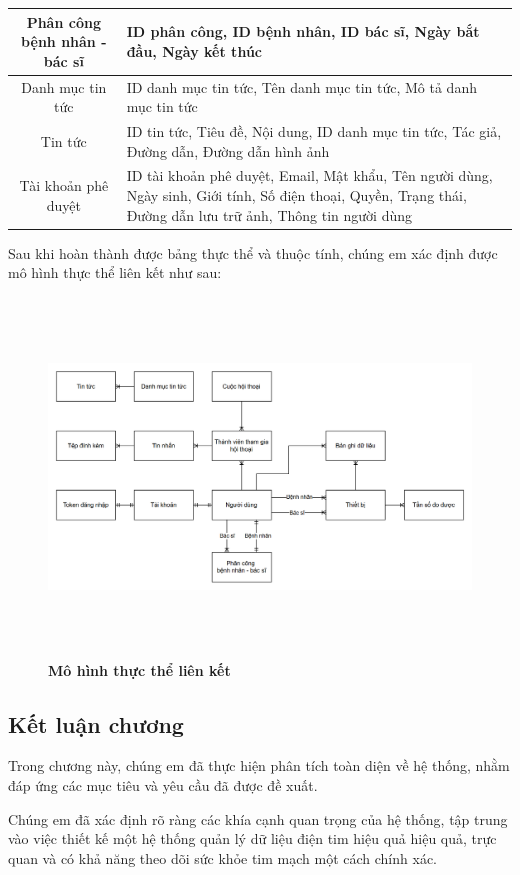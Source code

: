 \begin{table}[H]
\begin{tabularx}{0.9\textwidth}{|c|X|}
    \hline 
    Phân công bệnh nhân - bác sĩ & 
    ID phân công, ID bệnh nhân, ID bác sĩ, Ngày bắt đầu, Ngày kết thúc \\
    \hline
    Danh mục tin tức &
    ID danh mục tin tức, Tên danh mục tin tức, Mô tả danh mục tin tức \\
    \hline
    Tin tức &
    ID tin tức, Tiêu đề, Nội dung, ID danh mục tin tức, Tác giả, Đường dẫn, Đường dẫn hình ảnh \\
    \hline
    Tài khoản phê duyệt & 
    ID tài khoản phê duyệt, Email, Mật khẩu, Tên người dùng, Ngày sinh, Giới tính, Số điện thoại, Quyền, Trạng thái, Đường dẫn lưu trữ ảnh, Thông tin người dùng \\
    \hline
  \end{tabularx}

  
\end{table}
Sau khi hoàn thành được bảng thực thể và thuộc tính, chúng em xác định được mô hình thực thể liên kết như sau:

\begin{figure}[H]
  \centering
  \includegraphics[width=15cm,height=9.5cm]{Images/system/fmECG_connection_entity.png}
  \caption[Mô hình thực thể liên kết]{\bfseries \fontsize{12pt}{0pt}
  \selectfont Mô hình thực thể liên kết}
  \label{ttlk} %
\end{figure}

\subsection{Kết luận chương}

Trong chương này, chúng em đã thực hiện phân tích toàn diện về
 hệ thống, nhằm đáp ứng các mục tiêu và yêu cầu đã được đề xuất.

Chúng em đã xác định rõ ràng các khía cạnh quan trọng của hệ thống,
 tập trung vào việc thiết kế một hệ thống quản lý dữ liệu điện tim hiệu quả hiệu quả,
  trực quan và có khả năng theo dõi sức khỏe tim mạch một cách
   chính xác. 


\newpage
